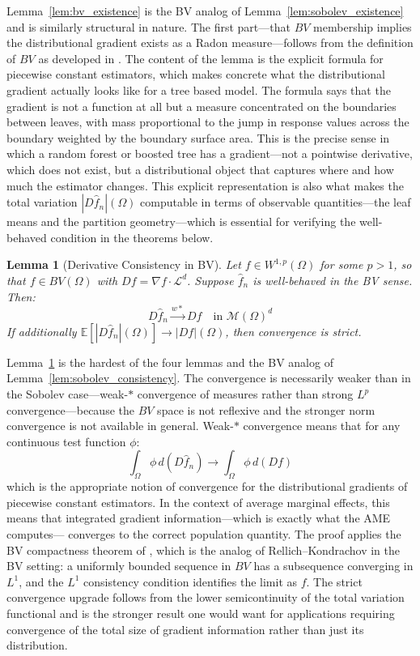 \documentclass[12pt]{article}
\newtheorem{lemma}{Lemma}
\newcommand{\E}{\mathbb{E}}
\newcommand{\Wonep}{W^{1,p}(\Omega)}
\newcommand{\BV}{BV(\Omega)}
\newcommand{\cM}{\mathcal{M}(\Omega)^d}
\newcommand{\fn}{\hat{f}_n}
\newcommand{\wstar}{\xrightarrow{w*}}
\begin{document}
	Lemma~\ref{lem:bv_existence} is the BV analog of
	Lemma~\ref{lem:sobolev_existence} and is similarly structural in nature. The first
	part---that $BV$ membership implies the distributional gradient exists as a Radon
	measure---follows from the definition of $BV$ as developed in
	\citet[Chapter~3]{ambrosio2000bv}. The content of the lemma is the explicit formula
	for piecewise constant estimators, which makes concrete what the distributional
	gradient actually looks like for a tree based model. The formula says that the
	gradient is not a function at all but a measure concentrated on the boundaries
	between leaves, with mass proportional to the jump in response values across the
	boundary weighted by the boundary surface area. This is the precise sense in which a
	random forest or boosted tree has a gradient---not a pointwise derivative, which does
	not exist, but a distributional object that captures where and how much the estimator
	changes. This explicit representation is also what makes the total variation
	$|D\fn|(\Omega)$ computable in terms of observable quantities---the leaf means and
	the partition geometry---which is essential for verifying the well-behaved condition
	in the theorems below.
	
	\begin{lemma}[Derivative Consistency in BV]
		\label{lem:bv_consistency}
		Let $f \in \Wonep$ for some $p > 1$, so that $f \in \BV$ with
		$Df = \nabla f \cdot \mathcal{L}^d$. Suppose $\fn$ is well-behaved in the BV sense.
		Then:
		\begin{equation}
			D\fn \wstar Df \quad \text{in } \cM
		\end{equation}
		If additionally $\E[|D\fn|(\Omega)] \to |Df|(\Omega)$, then convergence is strict.
	\end{lemma}
	
	Lemma~\ref{lem:bv_consistency} is the hardest of the four lemmas and the BV analog
	of Lemma~\ref{lem:sobolev_consistency}. The convergence is necessarily weaker than
	in the Sobolev case---weak-$*$ convergence of measures rather than strong $L^p$
	convergence---because the $BV$ space is not reflexive and the stronger norm
	convergence is not available in general. Weak-$*$ convergence means that for any
	continuous test function $\phi$:
	\begin{equation}
		\int_\Omega \phi \, d(D\fn) \to \int_\Omega \phi \, d(Df)
	\end{equation}
	which is the appropriate notion of convergence for the distributional gradients of
	piecewise constant estimators. In the context of average marginal effects, this means
	that integrated gradient information---which is exactly what the AME computes---
	converges to the correct population quantity. The proof applies the BV compactness
	theorem of \citet[Theorem~3.23]{ambrosio2000bv}, which is the analog of
	Rellich--Kondrachov in the BV setting: a uniformly bounded sequence in $BV$ has a
	subsequence converging in $L^1$, and the $L^1$ consistency condition identifies the
	limit as $f$. The strict convergence upgrade follows from the lower semicontinuity of
	the total variation functional and is the stronger result one would want for
	applications requiring convergence of the total size of gradient information rather
	than just its distribution.
	
\end{document}
